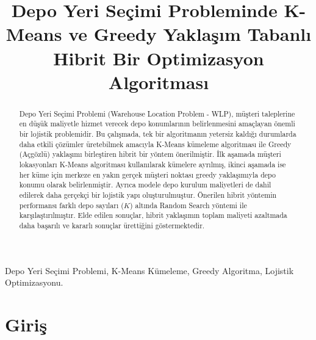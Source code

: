 \documentclass[conference]{IEEEtran}
\begin{document}
\title{Depo Yeri Seçimi Probleminde K-Means ve Greedy Yaklaşım Tabanlı Hibrit Bir Optimizasyon Algoritması}

\author{
    \and
}

\maketitle

\begin{abstract}

Depo Yeri Seçimi Problemi (Warehouse Location Problem - WLP), müşteri taleplerine en düşük maliyetle hizmet verecek depo konumlarının belirlenmesini amaçlayan önemli bir lojistik problemidir. Bu çalışmada, tek bir algoritmanın yetersiz kaldığı durumlarda daha etkili çözümler üretebilmek amacıyla K-Means kümeleme algoritması ile Greedy (Açgözlü) yaklaşımı birleştiren hibrit bir yöntem önerilmiştir. İlk aşamada müşteri lokasyonları K-Means algoritması kullanılarak kümelere ayrılmış, ikinci aşamada ise her küme için merkeze en yakın gerçek müşteri noktası greedy yaklaşımıyla depo konumu olarak belirlenmiştir. Ayrıca modele depo kurulum maliyetleri de dahil edilerek daha gerçekçi bir lojistik yapı oluşturulmuştur. Önerilen hibrit yöntemin performansı farklı depo sayıları ($K$) altında Random Search yöntemi ile karşılaştırılmıştır. Elde edilen sonuçlar, hibrit yaklaşımın toplam maliyeti azaltmada daha başarılı ve kararlı sonuçlar ürettiğini göstermektedir.

\end{abstract}

\begin{IEEEkeywords}
Depo Yeri Seçimi Problemi, K-Means Kümeleme, Greedy Algoritma, Lojistik Optimizasyonu.
\end{IEEEkeywords}

\section{Giriş}
\end{document}
